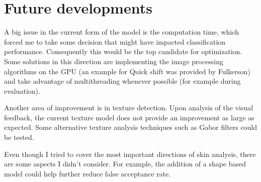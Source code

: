 \documentclass[12pt]{report}
\begin{document}
	\section{Future developments}
	A big issue in the current form of the model is the computation time, which forced me to take some decision that might have impacted classification performance. Consequently this would be the top candidate for optimization. Some solutions in this direction are implementing the image processing algorithms on the GPU (an example for Quick shift was provided by Fulkerson\cite{quickshift_gpu}) and take advantage of multithreading whenever possible (for example during evaluation).
	
	Another area of improvement is in texture detection. Upon analysis of the visual feedback, the current texture model does not provide an improvement as large as expected. Some alternative texture analysis techniques such as Gabor filters could be tested.
	
	Even though I tried to cover the most important directions of skin analysis, there are some aspects I didn't consider. For example, the addition of a shape based model could help further reduce false acceptance rate.
	
	\newpage
	
	
\end{document}
